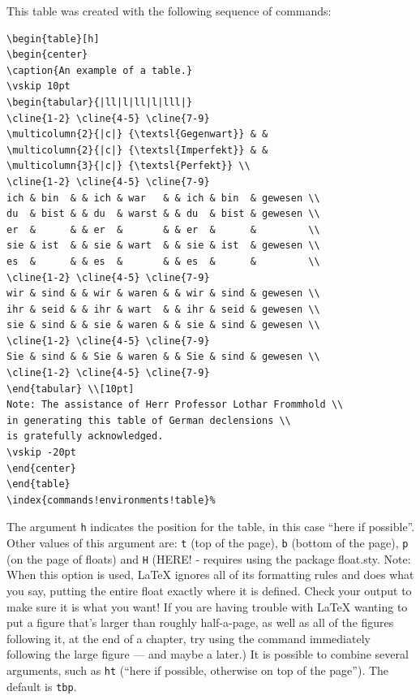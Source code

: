 This table was created with the following sequence 
of commands:
\begin{verbatim}
\begin{table}[h]
\begin{center}
\caption{An example of a table.}
\vskip 10pt
\begin{tabular}{|ll|l|ll|l|lll|}
\cline{1-2} \cline{4-5} \cline{7-9}
\multicolumn{2}{|c|} {\textsl{Gegenwart}} & &
\multicolumn{2}{|c|} {\textsl{Imperfekt}} & &
\multicolumn{3}{|c|} {\textsl{Perfekt}} \\
\cline{1-2} \cline{4-5} \cline{7-9}
ich & bin  & & ich & war   & & ich & bin  & gewesen \\
du  & bist & & du  & warst & & du  & bist & gewesen \\
er  &      & & er  &       & & er  &      &         \\
sie & ist  & & sie & wart  & & sie & ist  & gewesen \\
es  &      & & es  &       & & es  &      &         \\
\cline{1-2} \cline{4-5} \cline{7-9}
wir & sind & & wir & waren & & wir & sind & gewesen \\
ihr & seid & & ihr & wart  & & ihr & seid & gewesen \\
sie & sind & & sie & waren & & sie & sind & gewesen \\
\cline{1-2} \cline{4-5} \cline{7-9}
Sie & sind & & Sie & waren & & Sie & sind & gewesen \\
\cline{1-2} \cline{4-5} \cline{7-9}
\end{tabular} \\[10pt]
Note: The assistance of Herr Professor Lothar Frommhold \\
in generating this table of German declensions \\
is gratefully acknowledged.
\vskip -20pt
\end{center}
\end{table}
\index{commands!environments!table}%
\end{verbatim}

The argument \texttt{h} indicates the position for the 
table, in this case ``here if possible''. Other values
of this argument are:
\texttt{t} (top of the page),
\texttt{b} (bottom of the page),
\texttt{p} (on the page of floats) and 
\texttt{H} (HERE! - requires using the package float.sty.
Note: When this option is used, LaTeX ignores all of its formatting
rules and does what you say, putting the entire float exactly where
it is defined. Check your output to make sure it is what you want!
If you are having trouble with LaTeX wanting to put a figure that's
larger than roughly half-a-page, as well as all of the figures
following it, at the end of a chapter, try using the command
 immediately following the large figure --- and maybe
a  later.)
It is possible to combine several arguments, such as
\texttt{ht} (``here if possible, otherwise on top of
the page''). The default is \texttt{tbp}.

